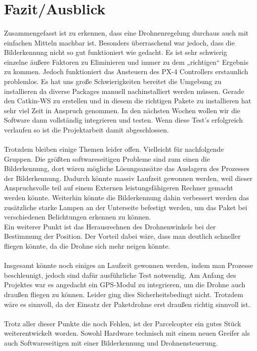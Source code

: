 \section{Fazit/Ausblick}
\paragraph{}
Zusammengefasst ist zu erkennen, dass eine Drohnenregelung durchaus auch mit einfachen Mitteln machbar ist. Besonders überraschend war jedoch, dass die Bilderkennung nicht so gut funktioniert wie gedacht. Es ist sehr schwierig einzelne äußere Faktoren zu Eliminieren und immer zu dem „richtigen“ Ergebnis zu kommen. Jedoch funktioniert das Ansteuern des PX-4 Controllers erstaunlich problemlos. Es hat uns große Schwierigkeiten bereitet die Umgebung zu installieren da diverse Packages manuell nachinstalliert werden müssen. Gerade den Catkin-WS zu erstellen und in diesem die richtigen Pakete zu installieren hat sehr viel Zeit in Anspruch genommen.
In den nächsten Wochen wollen wir die Software dann vollständig integrieren und testen. Wenn diese Test's erfolgreich verlaufen so ist die Projektarbeit damit abgeschlossen.\\
\\
Trotzdem bleiben einige Themen leider offen. Vielleicht für nachfolgende Gruppen.
Die größten softwareseitigen Probleme sind zum einen die Bilderkennung, dort wären mögliche Lösungsansätze das Auslagern des Prozesses der Bilderkennung. Dadurch könnte massiv Laufzeit gewonnen werden, weil dieser Anspruchsvolle teil auf einem Externen leistungsfähigeren Rechner gemacht werden könnte. 
Weiterhin könnte die Bilderkennung dahin verbessert werden das zusätzliche starke Lampen an der Unterseite befestigt werden, um das Paket bei verschiedenen Belichtungen erkennen zu können.\\
Ein weiterer Punkt ist das Herausrechnen des Drohnenwinkels bei der Bestimmung der Position. Der Vorteil dabei wäre, dass man deutlich schneller fliegen könnte, da die Drohne sich mehr neigen könnte.\\
\\
Insgesamt könnte noch einiges an Laufzeit gewonnen werden, indem man Prozesse beschleunigt, jedoch sind dafür ausführliche Test notwendig.
Am Anfang des Projektes war es angedacht ein GPS-Modul zu integrieren, um die Drohne auch draußen fliegen zu können. Leider ging dies Sicherheitsbedingt nicht. Trotzdem wäre es sinnvoll, da der Einsatz der Paketdrohne erst draußen richtig sinnvoll ist.\\
\\
Trotz aller dieser Punkte die noch Fehlen, ist der Parcelcopter ein gutes Stück weiterentwickelt worden. Sowohl Hardware technisch mit einem neuen Greifer als auch Softwareseitigen mit einer Bilderkennung und Drohnensteuerung.\\
\\
